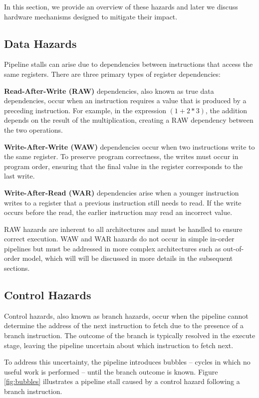 In this section, we provide an overview of these hazards and later we discuss hardware mechanisms designed to mitigate their impact.

\subsection{Data Hazards}

Pipeline stalls can arise due to dependencies between instructions that access the same registers. There are three primary types of register dependencies:

\textbf{Read-After-Write (RAW)} dependencies, also known as true data dependencies, occur when an instruction requires a value that is produced by a preceding instruction. For example, in the expression $(1 + 2 * 3)$, the addition depends on the result of the multiplication, creating a RAW dependency between the two operations.

\textbf{Write-After-Write (WAW)} dependencies occur when two instructions write to the same register. To preserve program correctness, the writes must occur in program order, ensuring that the final value in the register corresponds to the last write.

\textbf{Write-After-Read (WAR)} dependencies arise when a younger instruction writes to a register that a previous instruction still needs to read. If the write occurs before the read, the earlier instruction may read an incorrect value.

RAW hazards are inherent to all architectures and must be handled to ensure correct execution. WAW and WAR hazards do not occur in simple in-order pipelines but must be addressed in more complex architectures such as out-of-order model, which will will be discussed in more details in the subsequent sections.

\subsection{Control Hazards}

Control hazards, also known as branch hazards, occur when the pipeline cannot determine the address of the next instruction to fetch due to the presence of a branch instruction. The outcome of the branch is typically resolved in the execute stage, leaving the pipeline uncertain about which instruction to fetch next.

To address this uncertainty, the pipeline introduces bubbles -- cycles in which no useful work is performed -- until the branch outcome is known. Figure \ref{fig:bubbles} illustrates a pipeline stall caused by a control hazard following a branch instruction.

